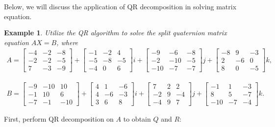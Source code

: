 \documentclass[3p]{elsarticle}
\newtheorem{example}[theorem]{Example}
\numberwithin{equation}{section}
\begin{document}
Below, we will discuss the application of QR decomposition in solving matrix equation.
\begin{example}
Utilize the QR algorithm to solve the split quaternion matrix equation $AX = B$, where
\begin{align*}
A =
\begin{bmatrix}
-4 & -2 & -8 \\
-2 & -2 & -5 \\
7 & -3 & -9
\end{bmatrix} +
\begin{bmatrix}
-1 & -2 & 4 \\
-5 & -8 & -5 \\
-4 & 0 & 6
\end{bmatrix} i 
+ 
\begin{bmatrix}
-9 & -6 & -8 \\
-2 & -10 & -5 \\
-10 & -7 & -7
\end{bmatrix} j +
\begin{bmatrix}
-8 & 9 & -3 \\
2 & -6 & 0 \\
8 & 0 & -5
\end{bmatrix} k,
\end{align*}

\begin{align*}
B =
\begin{bmatrix}
-9 & -10 & 10 \\
-1 & 10 & 6 \\
-7 & -1 & -10
\end{bmatrix} +
\begin{bmatrix}
4 & 1 & -6 \\
4 & -6 & -3 \\
3 & 6 & 8
\end{bmatrix} i 
+
\begin{bmatrix}
7 & 2 & 2 \\
-2 & 9 & -4 \\
-4 & 9 & 7
\end{bmatrix} j +
\begin{bmatrix}
-1 & 1 & -3 \\
8 & 5 & -7 \\
-10 & -7 & -4
\end{bmatrix} k.
\end{align*}
\end{example}  
First, perform QR decomposition on $A$ to obtain $Q$ and $R:$
\end{document}
